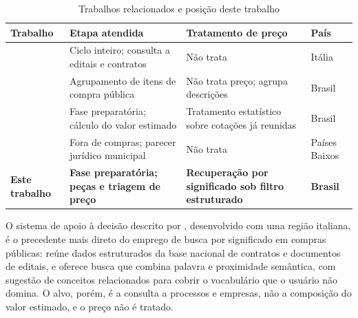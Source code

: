 
\begin{table}[H]
  \centering
  \caption{Trabalhos relacionados e posição deste trabalho}
  \label{tab:trabalhos-relacionados}
  \begin{ufopaespacosimples}
  \footnotesize
  \begin{tabularx}{\textwidth}{@{}lXXl@{}}
    \toprule
    \textbf{Trabalho} & \textbf{Etapa atendida} & \textbf{Tratamento de preço} &
      \textbf{País} \\
    \midrule
    \cite{siciliani2023apoio} & Ciclo inteiro; consulta a editais e contratos &
      Não trata & Itália \\
    \cite{brum2024agrupamento} & Agrupamento de itens de compra pública &
      Não trata preço; agrupa descrições & Brasil \\
    \cite{faria2025precos} & Fase preparatória; cálculo do valor estimado &
      Tratamento estatístico sobre cotações já reunidas & Brasil \\
    \cite{vandermeer2026legalcheck} & Fora de compras; parecer jurídico
      municipal & Não trata & Países Baixos \\
    \midrule
    \textbf{Este trabalho} & \textbf{Fase preparatória; peças e triagem de
      preço} & \textbf{Recuperação por significado sob filtro estruturado} &
      \textbf{Brasil} \\
    \bottomrule
  \end{tabularx}
  \end{ufopaespacosimples}
\end{table}

O sistema de apoio à decisão descrito por ,
desenvolvido com uma região italiana, é o precedente mais direto do emprego de
busca por significado em compras públicas: reúne dados estruturados da base
nacional de contratos e documentos de editais, e oferece busca que combina
palavra e proximidade semântica, com sugestão de conceitos relacionados para
cobrir o vocabulário que o usuário não domina. O alvo, porém, é a consulta a
processos e empresas, não a composição do valor estimado, e o preço não é
tratado.


